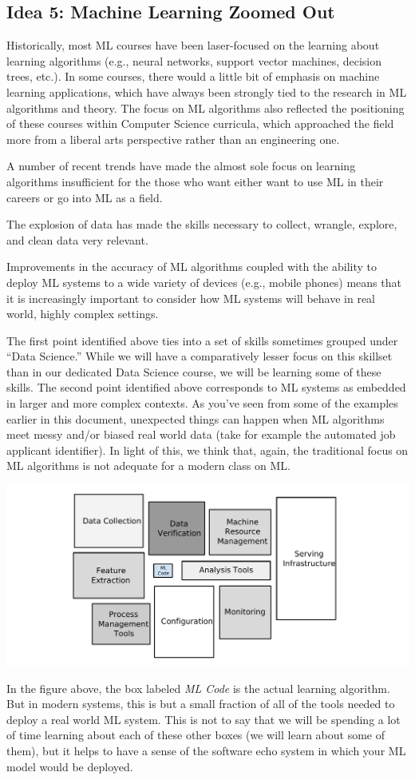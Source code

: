 \documentclass[assignment01_Solutions]{subfiles}
\begin{document}
\subsection*{Idea 5: Machine Learning Zoomed Out}

Historically, most ML courses have been laser-focused on the learning about learning algorithms (e.g., neural networks, support vector machines, decision trees, etc.).  In some courses, there would a little bit of emphasis on machine learning applications, which have always been strongly tied to the research in ML algorithms and theory.  The focus on ML algorithms also reflected the positioning of these courses within Computer Science curricula, which approached the field more from a liberal arts perspective rather than an engineering one.

A number of recent trends have made the almost sole focus on learning algorithms insufficient for the those who want either want to use ML in their careers or go into ML as a field.
\be
\item The explosion of data has made the skills necessary to collect, wrangle, explore, and clean data very relevant.
\item Improvements in the accuracy of ML algorithms coupled with the ability to deploy ML systems to a wide variety of devices (e.g., mobile phones) means that it is increasingly important to consider how ML systems will behave in real world, highly complex settings.
\ee

The first point identified above ties into a set of skills sometimes grouped under ``Data Science.''  While we will have a comparatively lesser focus on this skillset than in our dedicated Data Science course, we will be learning some of these skills.  The second point identified above corresponds to ML systems as embedded in larger and more complex contexts.  As you've seen from some of the examples earlier in this document, unexpected things can happen when ML algorithms meet messy and/or biased real world data (take for example the automated job applicant identifier).  In light of this, we think that, again, the traditional focus on ML algorithms is not adequate for a modern class on ML.


\begin{center}
\includegraphics[width=.6\linewidth]{figures/MlSystem}
\end{center}
In the figure above, the box labeled \emph{ML Code} is the actual learning algorithm.  But in modern systems, this is but a small fraction of all of the tools needed to deploy a real world ML system.  This is not to say that we will be spending a lot of time learning about each of these other boxes (we will learn about some of them), but it helps to have a sense of the software echo system in which your ML model would be deployed.
\end{document}
